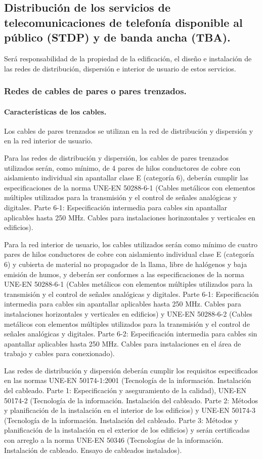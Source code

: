 \subsection{Distribución de los servicios de telecomunicaciones de telefonía disponible al público (STDP) y de banda ancha (TBA).}
Será responsabilidad de la propiedad de la edificación, el diseño e instalación de las redes de distribución, dispersión e interior de usuario de estos servicios.
\subsubsection{Redes de cables de pares o pares trenzados.}
\paragraph{Características de los cables.}
Los cables de pares trenzados se utilizan en la red de distribución y dispersión y en la red interior de usuario.


Para las redes de distribución y dispersión, los cables de pares trenzados utilizados serán, como mínimo, de 4 pares de hilos conductores de cobre con aislamiento individual sin apantallar clase E (categoría 6), deberán cumplir las especificaciones de la norma UNE-EN 50288-6-1 (Cables metálicos con elementos múltiples utilizados para la transmisión y el control de señales analógicas y digitales. Parte 6-1: Especificación intermedia para cables sin apantallar aplicables hasta 250 MHz. Cables para instalaciones horinzontales y verticales en edificios).


Para la red interior de usuario, los cables utilizados serán como mínimo de cuatro pares de hilos conductores de cobre con aislamiento individual clase E (categoría 6) y cubierta de material no propagador de la llama, libre de halógenos y baja emisión de humos, y deberán ser conformes a las especificaciones de la norma UNE-EN 50288-6-1 (Cables metálicos con elementos múltiples utilizados para la transmisión y el control de señales analógicas y digitales. Parte 6-1: Especificación intermedia para cables sin apantallar aplicables hasta 250 MHz. Cables para instalaciones horizontales y verticales en edificios) y UNE-EN 50288-6-2 (Cables metálicos con elementos múltiples utilizados para la transmisión y el control de señales analógicas y digitales. Parte 6-2: Especificación intermedia para cables sin apantallar aplicables hasta 250 MHz. Cables para instalaciones en el área de trabajo y cables para conexionado). 


Las redes de distribución y dispersión deberán cumplir los requisitos especificados en las normas UNE-EN 50174-1:2001 (Tecnología de la información. Instalación del cableado. Parte 1: Especificación y aseguramiento de la calidad), UNE-EN 50174-2 (Tecnología de la información. Instalación del cableado. Parte 2: Métodos y planificación de la instalación en el interior de los edificios) y UNE-EN 50174-3 (Tecnología de la información. Instalación del cableado. Parte 3: Métodos y planificación de la instalación en el exterior de los edificios) y serán certificadas con arreglo a la norma UNE-EN 50346 (Tecnologías de la información. Instalación de cableado. Ensayo de cableados instalados).


